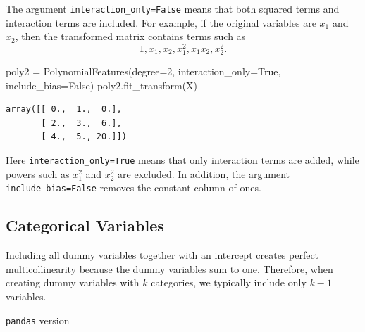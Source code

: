 \documentclass[
  letterpaper,
  DIV=11,
  numbers=noendperiod]{scrreprt}
\newenvironment{Shaded}{\begin{snugshade}}{\end{snugshade}}
\newcommand{\DecValTok}[1]{\textcolor[rgb]{0.68,0.00,0.00}{#1}}
\newcommand{\NormalTok}[1]{\textcolor[rgb]{0.00,0.23,0.31}{#1}}
\newcommand{\OperatorTok}[1]{\textcolor[rgb]{0.37,0.37,0.37}{#1}}
\newcommand{\VariableTok}[1]{\textcolor[rgb]{0.07,0.07,0.07}{#1}}
\theoremstyle{definition}
\theoremstyle{definition}
\theoremstyle{plain}
\theoremstyle{plain}
\theoremstyle{remark}
\begin{document}
The argument \texttt{interaction\_only=False} means that both squared
terms and interaction terms are included. For example, if the original
variables are \(x_1\) and \(x_2\), then the transformed matrix contains
terms such as \[
1,x_1,x_2,x_1^2,x_1x_2,x_2^2.
\]

\begin{Shaded}
\begin{Highlighting}[]
\NormalTok{poly2 }\OperatorTok{=}\NormalTok{ PolynomialFeatures(degree}\OperatorTok{=}\DecValTok{2}\NormalTok{, interaction\_only}\OperatorTok{=}\VariableTok{True}\NormalTok{, include\_bias}\OperatorTok{=}\VariableTok{False}\NormalTok{)}
\NormalTok{poly2.fit\_transform(X)}
\end{Highlighting}
\end{Shaded}

\begin{verbatim}
array([[ 0.,  1.,  0.],
       [ 2.,  3.,  6.],
       [ 4.,  5., 20.]])
\end{verbatim}

Here \texttt{interaction\_only=True} means that only interaction terms
are added, while powers such as \(x_1^2\) and \(x_2^2\) are excluded. In
addition, the argument \texttt{include\_bias=False} removes the constant
column of ones.

\subsection{Categorical Variables}\label{categorical-variables}

\begin{tcolorbox}[enhanced jigsaw, arc=.35mm, bottomrule=.15mm, bottomtitle=1mm, breakable, colback=white, colbacktitle=quarto-callout-caution-color!10!white, colframe=quarto-callout-caution-color-frame, coltitle=black, left=2mm, leftrule=.75mm, opacityback=0, opacitybacktitle=0.6, rightrule=.15mm, title=\textcolor{quarto-callout-caution-color}{\faFire}\hspace{0.5em}{Dummy Variable Trap}, titlerule=0mm, toprule=.15mm, toptitle=1mm]

Including all dummy variables together with an intercept creates perfect
multicollinearity because the dummy variables sum to one. Therefore,
when creating dummy variables with \(k\) categories, we typically
include only \(k-1\) variables.

\end{tcolorbox}

\texttt{pandas} version
\end{document}
